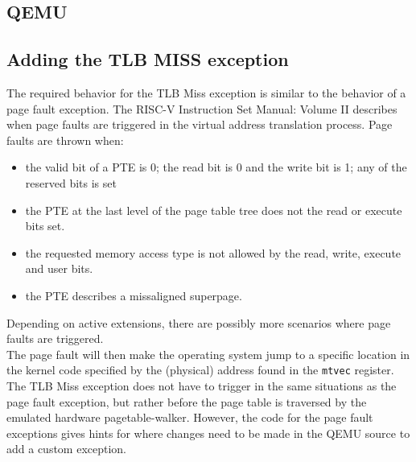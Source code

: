 
\subsection{QEMU}



\subsection{Adding the TLB MISS exception}
The required behavior for the TLB Miss exception is similar to the behavior of a page fault exception.
The RISC-V Instruction Set Manual: Volume II \cite{RISCVInstructionSet} describes when page faults
are triggered in the virtual address translation process. Page faults are thrown when:
\begin{itemize}
    \item the valid bit of a PTE is 0; the read bit is 0 and the write bit is 1; any of the reserved
          bits is set
    \item the PTE at the last level of the page table tree does not the read or execute bits set.
    \item the requested memory access type is not allowed by the read, write, execute and user bits.
    \item the PTE describes a missaligned superpage.
\end{itemize}
Depending on active extensions, there are possibly more scenarios where page faults are triggered.\\
The page fault will then make the operating system jump to a specific location in the kernel code
specified by the (physical) address found in the \texttt{mtvec} register.\\
The TLB Miss exception does not have to trigger in the same situations as the page fault exception,
but rather before the page table is traversed by the emulated hardware pagetable-walker.
However, the code for the page fault exceptions gives hints for where changes need to be made in the QEMU
source to add a custom exception.\\ %

